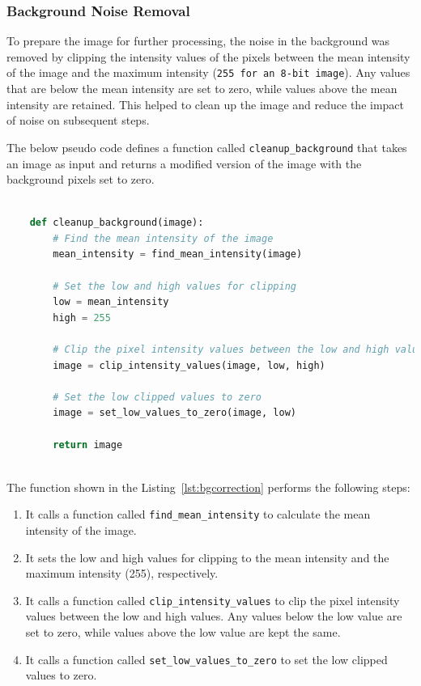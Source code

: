 \documentclass{book}
\begin{document}
	\subsubsection{Background Noise Removal}
	To prepare the image for further processing, the noise in the background was removed by clipping the intensity values of the pixels between the mean intensity of the image and the maximum intensity (\texttt{255 for an 8-bit image}). Any values that are below the mean intensity are set to zero, while values above the mean intensity are retained. This helped to clean up the image and reduce the impact of noise on subsequent steps.
	
	The below pseudo code defines a function called \texttt{cleanup\_background} that takes an image as input and returns a modified version of the image with the background pixels set to zero.
	
	\begin{lstlisting}[language=python, label=lst:bgcorrection, caption=Pseudo function to show the background noise removal in an image.]

	def cleanup_background(image):
		# Find the mean intensity of the image
		mean_intensity = find_mean_intensity(image)
	
		# Set the low and high values for clipping
		low = mean_intensity
		high = 255
	
		# Clip the pixel intensity values between the low and high values
		image = clip_intensity_values(image, low, high)
	
		# Set the low clipped values to zero
		image = set_low_values_to_zero(image, low)
	
		return image
	
	\end{lstlisting}	
	
	The function shown in the Listing~\ref{lst:bgcorrection} performs the following steps:
	
	\begin{enumerate}
		\item It calls a function called \texttt{find\_mean\_intensity} to calculate the mean intensity of the image.
		\item It sets the low and high values for clipping to the mean intensity and the maximum intensity (255), respectively.
		\item It calls a function called \texttt{clip\_intensity\_values} to clip the pixel intensity values between the low and high values. Any values below the low value are set to zero, while values above the low value are kept the same.
		\item It calls a function called \texttt{set\_low\_values\_to\_zero} to set the low clipped values to zero.
	\end{enumerate}
	
\end{document}
